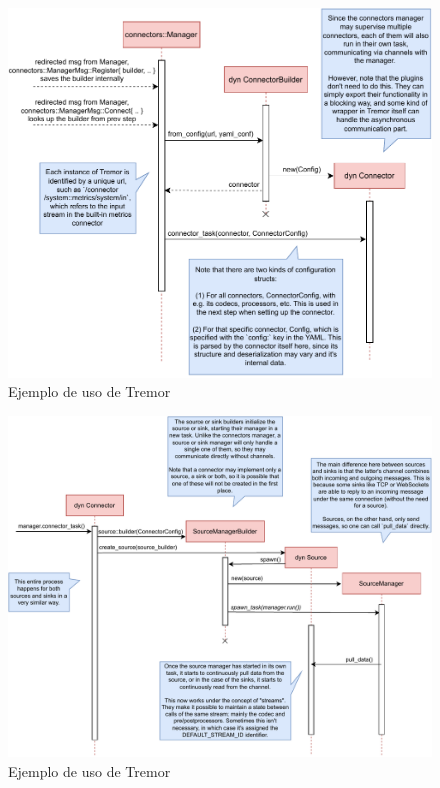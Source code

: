 \begin{figure}
    \centering
    \includegraphics[width=\textwidth]{./Imagenes/initializing.pdf}
    \caption{Ejemplo de uso de Tremor}%
    \label{fig:tremor_initializing}
\end{figure}

\begin{figure}
    \centering
    \includegraphics[width=\textwidth]{./Imagenes/setting-up.pdf}
    \caption{Ejemplo de uso de Tremor}%
    \label{fig:tremor_setting_up}
\end{figure}
